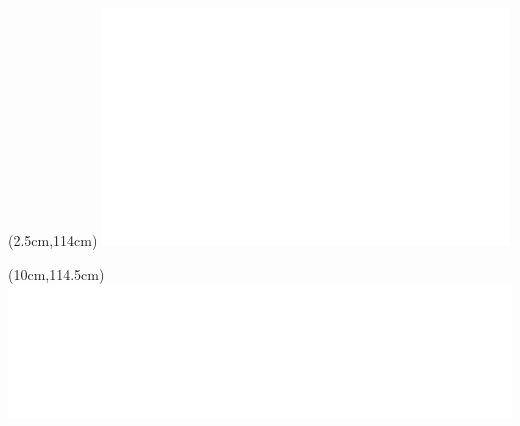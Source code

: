 \documentclass[final,12pt]{beamer} %
\begin{document}
\begin{frame}
\begin{textblock*}{70cm}
\end{textblock*}


\begin{textblock*}{5.5cm}(2.5cm,114cm)
 \includegraphics[width=\columnwidth]{./logos/logo_epsrc.png}
\end{textblock*}

\begin{textblock*}{6cm}(10cm,114.5cm)
 \includegraphics[width=\columnwidth]{./logos/logo_qmul.png}
\end{textblock*}
% 
% 
% 



\end{frame}
\end{document}
